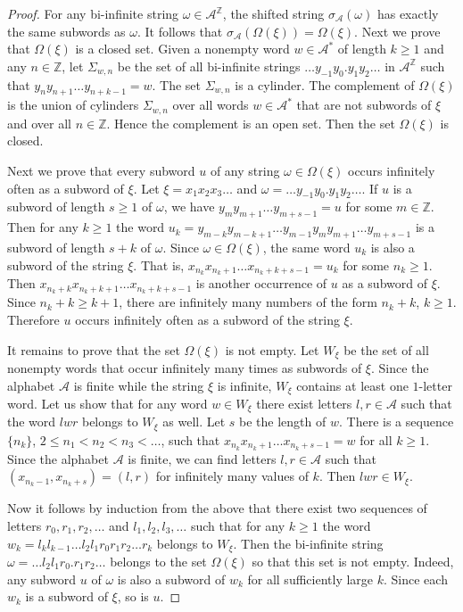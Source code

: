 \documentclass[12pt]{article}
\theoremstyle{definition}
\def\bZ{\mathbb{Z}}
\def\cA{\mathcal{A}}
\def\om{\omega}
\def\si{\sigma}
\def\Om{\Omega}
\begin{document}
\begin{proof}
For any bi-infinite string $\om\in\cA^{\bZ}$, the shifted string 
$\si_{\cA}(\om)$ has exactly the same subwords as $\om$.  It follows that 
$\si_{\cA}(\Omega(\xi))=\Omega(\xi)$.  Next we prove that $\Omega(\xi)$ is 
a closed set.  Given a nonempty word $w\in\cA^*$ of length $k\ge1$ and any 
$n\in\bZ$, let $\Sigma_{w,n}$ be the set of all bi-infinite strings $\ldots 
y_{-1}y_0.y_1y_2\ldots$ in $\cA^{\bZ}$ such that $y_ny_{n+1}\ldots 
y_{n+k-1}=w$.  The set $\Sigma_{w,n}$ is a cylinder.  The complement of 
$\Omega(\xi)$ is the union of cylinders $\Sigma_{w,n}$ over all words 
$w\in\cA^*$ that are not subwords of $\xi$ and over all $n\in\bZ$.  Hence 
the complement is an open set.  Then the set $\Omega(\xi)$ is closed.

Next we prove that every subword $u$ of any string $\om\in\Om(\xi)$ occurs 
infinitely often as a subword of $\xi$.  Let $\xi=x_1x_2x_3\ldots$ and 
$\om=\ldots y_{-1}y_0.y_1y_2\ldots$.  If $u$ is a subword of length $s\ge1$ 
of $\om$, we have $y_my_{m+1}\ldots y_{m+s-1}=u$ for some $m\in\bZ$.  Then 
for any $k\ge1$ the word $u_k=y_{m-k}y_{m-k+1}\ldots 
y_{m-1}y_my_{m+1}\ldots y_{m+s-1}$ is a subword of length $s+k$ of $\om$.  
Since $\om\in\Om(\xi)$, the same word $u_k$ is also a subword of the string 
$\xi$.  That is, $x_{n_k}x_{n_k+1}\ldots x_{n_k+k+s-1}=u_k$ for some 
$n_k\ge1$.  Then $x_{n_k+k}x_{n_k+k+1}\ldots x_{n_k+k+s-1}$ is another 
occurrence of $u$ as a subword of $\xi$.  Since $n_k+k\ge k+1$, there are 
infinitely many numbers of the form $n_k+k$, $k\ge1$.  Therefore $u$ occurs 
infinitely often as a subword of the string $\xi$.

It remains to prove that the set $\Om(\xi)$ is not empty.  Let $W_\xi$ be 
the set of all nonempty words that occur infinitely many times as subwords 
of $\xi$.  Since the alphabet $\cA$ is finite while the string $\xi$ is 
infinite, $W_\xi$ contains at least one $1$-letter word.  Let us show that 
for any word $w\in W_\xi$ there exist letters $l,r\in\cA$ such that the 
word $lwr$ belongs to $W_\xi$ as well.  Let $s$ be the length of $w$.  
There is a sequence $\{n_k\}$, $2\le n_1<n_2<n_3<\ldots$, such that 
$x_{n_k}x_{n_k+1}\ldots x_{n_k+s-1}=w$ for all $k\ge1$.  Since the 
alphabet $\cA$ is finite, we can find letters $l,r\in\cA$ such that 
$(x_{n_k-1},x_{n_k+s})=(l,r)$ for infinitely many values of $k$.  Then 
$lwr\in W_\xi$.

Now it follows by induction from the above that there exist two sequences 
of letters $r_0,r_1,r_2,\dots$ and $l_1,l_2,l_3,\dots$ such that for any 
$k\ge1$ the word $w_k=l_kl_{k-1}\ldots l_2l_1r_0r_1r_2\ldots r_k$ belongs 
to $W_\xi$.  Then the bi-infinite string $\om=\ldots l_2l_1r_0.r_1r_2 
\ldots$ belongs to the set $\Om(\xi)$ so that this set is not empty.  
Indeed, any subword $u$ of $\om$ is also a subword of $w_k$ for all 
sufficiently large $k$.  Since each $w_k$ is a subword of $\xi$, so is $u$.
\end{proof}
\end{document}
